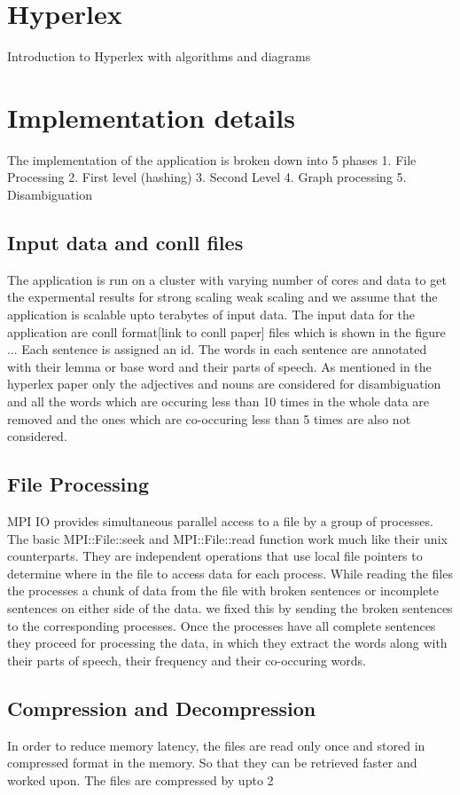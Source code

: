 \documentclass[article,dr=phil,type=drfinal,colorback,accentcolor=tud9c]{tudthesis}
\begin{document}
\newpage
\section{Hyperlex}
Introduction to Hyperlex with algorithms and diagrams

\newpage
\section{Implementation details}
The implementation of the application is broken down into 5 phases
1. File Processing
2. First level (hashing)
3. Second Level
4. Graph processing
5. Disambiguation
\newpage
\subsection{Input data and conll files}
The application is run on a cluster with varying number of cores and data to get the expermental results for strong scaling weak scaling and we assume that the application is scalable upto terabytes of input data. The input data for the application are conll format[link to conll paper] files which is shown in the figure ... Each sentence is assigned an id. The words in each sentence are annotated with their lemma or base word and their parts of speech.  As mentioned in the hyperlex paper only the adjectives and nouns are considered for disambiguation and all the words which are occuring less than 10 times in the whole data are removed and the ones which are co-occuring less than 5 times are also not considered.

\newpage
\subsection{File Processing}
MPI IO provides simultaneous parallel access to a file by a group of processes.  The basic MPI::File::seek and MPI::File::read function work much like their unix counterparts. They are independent operations that use local file pointers to determine where in the file to access data for each process. While reading the files the processes a chunk of data from the file with broken sentences or incomplete sentences on either side of the data. we fixed this by sending the broken sentences to the corresponding processes. Once the processes have all complete sentences they proceed for processing the data, in which they extract the words along with their parts of speech, their frequency and their co-occuring words.

\newpage
\subsection{Compression and Decompression}
In order to reduce memory latency, the files are read only once and stored in compressed format in the memory. So that they can be retrieved faster and worked upon. The files are compressed by upto 2%
\end{document}
